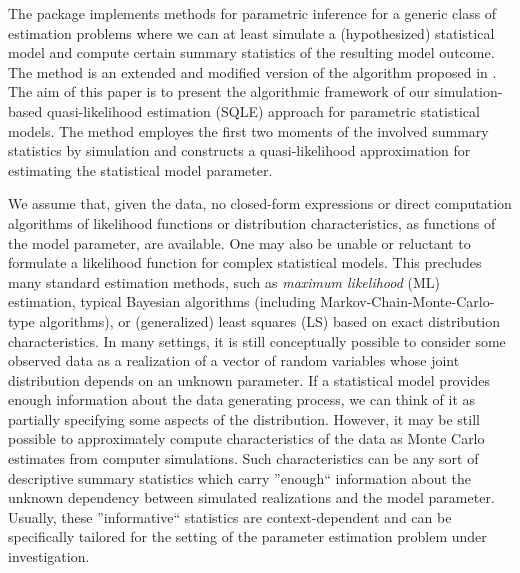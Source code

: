 The  package  implements methods for parametric inference
for a generic class of estimation problems where we can at least simulate a
(hypothesized) statistical model and compute certain summary statistics of
the resulting model outcome. The method is an extended and modified
version of the algorithm proposed in \citet{Baaske2014}. The aim of this paper
is to present the algorithmic framework of our simulation-based quasi-likelihood
estimation (SQLE) approach for parametric statistical models. The method
employes the first two moments of the involved summary statistics by simulation and
constructs a quasi-likelihood approximation for estimating the statistical model
parameter.\par
%
We assume that, given the data, no closed-form expressions or direct computation
algorithms of likelihood functions or distribution characteristics, as functions of the
model parameter, are available. One may also be unable or reluctant to formulate
a likelihood function for complex statistical models. This precludes many standard
estimation methods, such as \emph{maximum likelihood} (ML) estimation,
typical Bayesian algorithms (including Markov-Chain-Monte-Carlo-type algorithms), or (generalized) least
squares (LS) based on exact distribution characteristics. In many settings, it is still conceptually
possible to consider some observed data as a realization of a vector of random
variables whose joint distribution depends on an unknown parameter. If a statistical model provides enough
information about the data generating process, we can think of it as partially
specifying some aspects of the distribution. However, it may be still possible to approximately compute
characteristics of the data as Monte Carlo estimates from computer simulations.
Such characteristics can be any sort of descriptive summary statistics which carry ''enough`` information
about the unknown dependency between simulated realizations and the model
parameter. Usually, these ''informative`` statistics are context-dependent and can be specifically tailored for the
setting of the parameter estimation problem under investigation.\par
%
